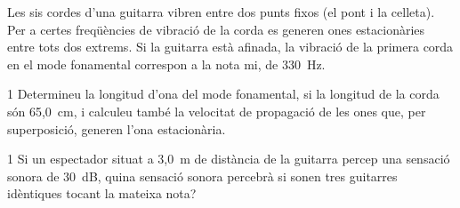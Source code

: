 Les sis cordes d'una guitarra vibren entre dos punts fixos (el pont i la celleta). Per a certes freqüències de vibració de la corda es generen ones estacionàries entre tots dos extrems. Si la guitarra està afinada, la vibració de la primera corda en el mode fonamental correspon a la nota mi, de 330~Hz.

\begin{apartat}{1}
Determineu la longitud d'ona del mode fonamental, si la longitud de la corda són 65,0~cm, i calculeu també la velocitat de propagació de les ones que, per superposició, generen l'ona estacionària.
\end{apartat}

\begin{apartat}{1}
Si un espectador situat a 3,0~m de distància de la guitarra percep una sensació sonora de 30~dB, quina sensació sonora percebrà si sonen tres guitarres idèntiques tocant la mateixa nota?
\end{apartat}

